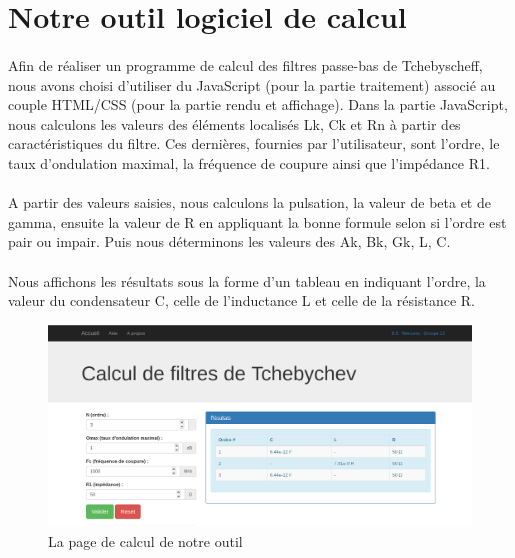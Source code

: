 \documentclass[a4paper,11pt]{article}
\begin{document}
    \clearpage{}

    \section{Notre outil logiciel de calcul}
        \paragraph{}
Afin de réaliser un programme de calcul des filtres passe-bas de Tchebyscheff, nous avons choisi d’utiliser du JavaScript (pour la partie traitement) associé au couple HTML/CSS (pour la partie rendu et affichage).
Dans la partie JavaScript, nous calculons les valeurs des éléments localisés Lk, Ck et Rn à partir des caractéristiques du filtre.
Ces dernières, fournies par l'utilisateur, sont l’ordre, le taux d’ondulation maximal, la fréquence de coupure ainsi que l’impédance R1.
        \paragraph{}
A partir des valeurs saisies, nous calculons la pulsation, la valeur de beta et de gamma, ensuite la valeur de R en appliquant la bonne formule selon si l’ordre est pair ou impair.
Puis nous déterminons les valeurs des Ak, Bk, Gk, L, C.
        \paragraph{}
Nous affichons les résultats sous la forme d’un tableau en indiquant l’ordre, la valeur du condensateur C, celle de l’inductance L et celle de la résistance R.
    \\
    \begin{figure}[h]
        \begin{center}
            \includegraphics[scale=0.3]{images/filtres/screen-site.png}
        \end{center}
            \caption{ La page de calcul de notre outil }
            \label{La page de calcul de notre outil de calcul de filtres de Tchebyscheff}
    \end{figure}
\end{document}
